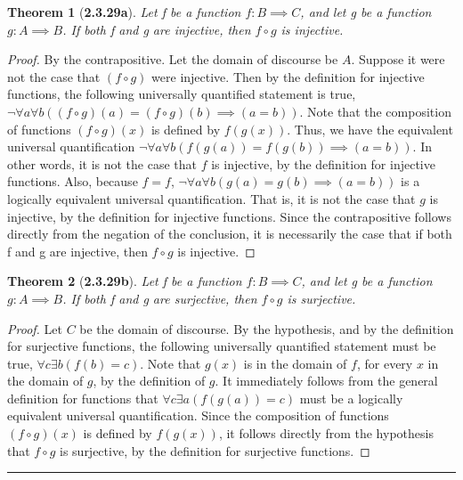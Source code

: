 \documentclass[a4paper, 12pt]{article}
\theoremstyle{plain}
\newtheorem*{theorem*}{Theorem}
\begin{document}
\begin{theorem*}[\textbf{2.3.29a}]
    Let f be a function $f: B \implies C$, and let g be a function $g: A \implies B$. If both 
    f and g are injective, then $f \circ g$ is injective.
\end{theorem*}

\begin{proof}
    By the contrapositive. Let the domain of discourse be $A$. 
    \newline Suppose it were not the case that $(f \circ g)$ were injective. Then by the 
    \newline definition for injective functions, the following universally quantified 
    \newline statement is true, 
    $\lnot \forall a \forall b ((f \circ g)(a) = (f \circ g)(b) \implies (a = b))$. Note that 
    the composition of functions $(f \circ g)(x)$ is defined by $f(g(x))$. Thus, we have the 
    equivalent universal quantification 
    $\lnot \forall a \forall b (f(g(a)) = f(g(b)) \implies (a = b))$. In other words, it is not 
    the case that $f$ is injective, by the definition for injective functions. Also, because 
    $f = f$, $\lnot \forall a \forall b (g(a) = g(b) \implies (a = b))$ is a logically 
    equivalent universal quantification. That is, it is not the case that $g$ is injective, by the 
    definition for injective functions. Since the contrapositive follows directly from the negation 
    of the conclusion, it is necessarily the case that if both f and g are injective, then 
    $f \circ g$ is injective.
\end{proof}

\pagebreak


\begin{theorem*}[\textbf{2.3.29b}]
    Let f be a function $f: B \implies C$, and let g be a function $g: A \implies B$. If both f 
    and g are surjective, then $f \circ g$ is surjective.
\end{theorem*}

\begin{proof}
    Let $C$ be the domain of discourse. By the hypothesis, and by the definition for surjective 
    functions, the following universally quantified \newline statement must be true, 
    $\forall c \exists b (f(b) = c)$. Note that $g(x)$ is in the domain of $f$, for every $x$ 
    in the domain of $g$, by the definition of $g$. It immediately follows from the general 
    definition for functions that $\forall c \exists a (f(g(a)) = c)$ must be a logically 
    equivalent universal quantification. Since the composition of \newline functions 
    $(f \circ g)(x)$ is defined by $f(g(x))$, it follows directly from the \newline hypothesis 
    that $f \circ g$ is surjective, by the definition for surjective functions.  
\end{proof}
\begin{center}
    \rule{5.4in}{1pt}
\end{center}
\end{document}
